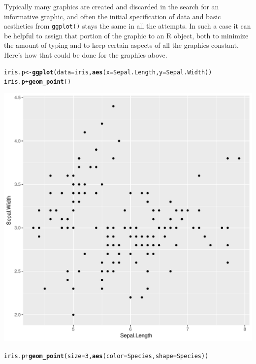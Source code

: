 \documentclass[12pt,oneside]{book}\usepackage[]{graphicx}\usepackage[]{color}
\makeatletter
\def\maxwidth{ %
  \ifdim\Gin@nat@width>\linewidth
    \linewidth
  \else
    \Gin@nat@width
  \fi
}
\newcommand{\hlnum}[1]{\textcolor[rgb]{0.686,0.059,0.569}{#1}}%
\newcommand{\hlopt}[1]{\textcolor[rgb]{0,0,0}{#1}}%
\newcommand{\hlstd}[1]{\textcolor[rgb]{0.345,0.345,0.345}{#1}}%
\newcommand{\hlkwb}[1]{\textcolor[rgb]{0.69,0.353,0.396}{#1}}%
\newcommand{\hlkwc}[1]{\textcolor[rgb]{0.333,0.667,0.333}{#1}}%
\newcommand{\hlkwd}[1]{\textcolor[rgb]{0.737,0.353,0.396}{\textbf{#1}}}%
\newenvironment{kframe}{%
 \def\at@end@of@kframe{}%
 \ifinner\ifhmode%
  \def\at@end@of@kframe{\end{minipage}}%
  \begin{minipage}{\columnwidth}%
 \fi\fi%
 \def\FrameCommand##1{\hskip\@totalleftmargin \hskip-\fboxsep
 \colorbox{shadecolor}{##1}\hskip-\fboxsep
     \hskip-\linewidth \hskip-\@totalleftmargin \hskip\columnwidth}%
 \MakeFramed {\advance\hsize-\width
   \@totalleftmargin\z@ \linewidth\hsize
   \@setminipage}}%
 {\par\unskip\endMakeFramed%
 \at@end@of@kframe}
\newenvironment{knitrout}{}{} %
\makeatother
\begin{document}
Typically many graphics are created and discarded in the search for an informative graphic, and often the initial specification of data and basic aesthetics from \verb+ggplot()+ stays the same in all the attempts. In such a case it can be helpful to assign that portion of the graphic to an R object, both to minimize the amount of typing and to keep certain aspects of all the graphics constant. Here's how that could be done for the graphics above.
\begin{knitrout}
\color{fgcolor}\begin{kframe}
\begin{alltt}
\hlstd{iris.p} \hlkwb{<-} \hlkwd{ggplot}\hlstd{(}\hlkwc{data} \hlstd{= iris,} \hlkwd{aes}\hlstd{(}\hlkwc{x} \hlstd{= Sepal.Length,} \hlkwc{y} \hlstd{= Sepal.Width))}
\hlstd{iris.p} \hlopt{+} \hlkwd{geom_point}\hlstd{()}
\end{alltt}
\end{kframe}
\includegraphics[width=\maxwidth]{figure/unnamed-chunk-64-1} 
\begin{kframe}\begin{alltt}
\hlstd{iris.p} \hlopt{+} \hlkwd{geom_point}\hlstd{(}\hlkwc{size} \hlstd{=} \hlnum{3}\hlstd{,} \hlkwd{aes}\hlstd{(}\hlkwc{color} \hlstd{= Species,} \hlkwc{shape} \hlstd{= Species))}
\end{alltt}

\end{kframe}
\end{knitrout}
\end{document}
